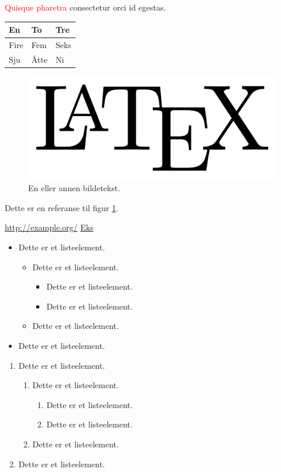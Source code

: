 \documentclass[12pt]{article}
\begin{document}
\textcolor{red}{Quisque pharetra} consectetur orci id egestas.

\newpage


\begin{tabular}{| l || l | l |}
\hline
En & To & Tre \\
\hline
\hline
Fire & Fem & Seks \\
\hline
Sju & Åtte & Ni \\
\hline
\end{tabular}


\begin{figure}[h!]
\includegraphics[width=\textwidth]{latexlogo.png}

\caption{En eller annen bildetekst.}

\label{fig:logo}
\end{figure}

Dette er en referanse til figur \ref{fig:logo}.

\listoffigures

\url{http://example.org/}
\href{http://example.org/}{Eks}


\newpage


\begin{itemize}
\item Dette er et listeelement.
\begin{itemize}
\item Dette er et listeelement.
\begin{itemize}
\item Dette er et listeelement.
\item Dette er et listeelement.
\end{itemize}
\item Dette er et listeelement.
\end{itemize}
\item Dette er et listeelement.
\end{itemize}


\begin{enumerate}
\item Dette er et listeelement.
\begin{enumerate}
\item Dette er et listeelement.
\begin{enumerate}
\item Dette er et listeelement.
\item Dette er et listeelement.
\end{enumerate}
\item Dette er et listeelement.
\end{enumerate}
\item Dette er et listeelement.
\end{enumerate}
\end{document}
